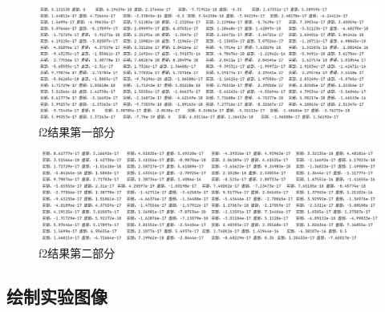 \documentclass[12pt,a4paper,oneside]{article}
\begin{document}
\begin{figure}[H]
    \centering
    \includegraphics[width = \textwidth]{figs/f2_1.png}
    \caption{f2结果第一部分}
\end{figure}

\begin{figure}[H]
    \centering
    \includegraphics[width = \textwidth]{figs/f2_2.png}
    \caption{f2结果第二部分}
\end{figure}

\subsection{绘制实验图像}
\end{document}
